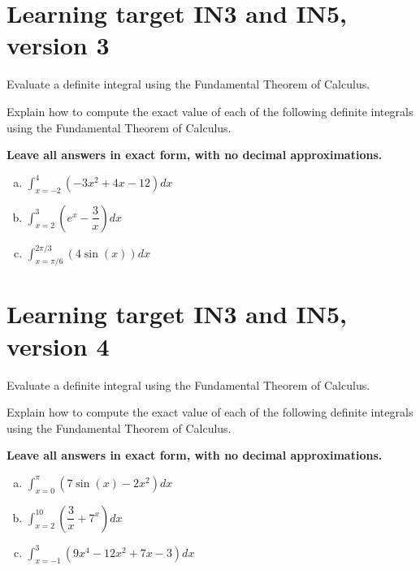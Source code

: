 \section{Learning target IN3 and IN5, version 3} 

Evaluate a definite integral using the Fundamental Theorem of Calculus.

\hrulefill


Explain how to compute the exact value of each of the following definite integrals using the Fundamental Theorem of Calculus. 

\textbf{Leave all answers in exact form, with no decimal approximations. }

\begin{enumerate}[(a)]
\item
\(\displaystyle \int_{x= -2 }^{ 4 } \left( -3x^2 + 4x - 12\right) dx\)
\vfill
\item 
\(\displaystyle \int_{ x=2 }^{ 3 } \left( e^x - \dfrac{3}{x}\right) dx\) 
\vfill
\item
\(\displaystyle \int_{x=\pi/6}^{2\pi/3} \left( 4\sin(x) \right) dx\)
\vfill

\end{enumerate}
\pagebreak
\section{Learning target IN3 and IN5, version 4} 

Evaluate a definite integral using the Fundamental Theorem of Calculus.

\hrulefill


Explain how to compute the exact value of each of the following definite integrals using the Fundamental Theorem of Calculus. 

\textbf{Leave all answers in exact form, with no decimal approximations. }

\begin{enumerate}[(a)]
\item
\(\displaystyle \int_{x= 0 }^{ \pi } \left( 7\sin(x) - 2x^2\right) dx\)
\vfill
\item 
\(\displaystyle \int_{ x=2 }^{ 10 } \left( \dfrac{3}{x} + 7^x\right) dx\) 
\vfill
\item
\(\displaystyle \int_{x=-1}^{3} \left(9x^4-12x^2+7x-3 \right) dx\)
\vfill

\end{enumerate}
\pagebreak
